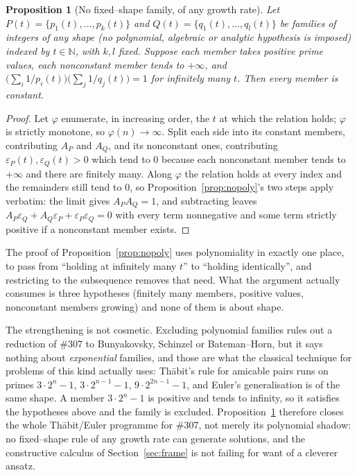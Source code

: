\documentclass[11pt]{article}
\newtheorem{proposition}[theorem]{Proposition}
\theoremstyle{definition}
\begin{document}
\begin{proposition}[No fixed--shape family, of any growth rate]\label{prop:nofamily}
Let $P(t)=\{p_1(t),\dots,p_k(t)\}$ and $Q(t)=\{q_1(t),\dots,q_l(t)\}$ be families of integers of
\emph{any} shape (no polynomial, algebraic or analytic hypothesis is imposed) indexed by
$t\in\mathbb{N}$, with $k,l$ fixed. Suppose each member takes positive prime values, each nonconstant
member tends to $+\infty$, and
$\bigl(\sum_i1/p_i(t)\bigr)\bigl(\sum_j1/q_j(t)\bigr)=1$ for \emph{infinitely many} $t$. Then every
member is constant.
\end{proposition}
\begin{proof}
Let $\varphi$ enumerate, in increasing order, the $t$ at which the relation holds; $\varphi$ is
strictly monotone, so $\varphi(n)\to\infty$. Split each side into its constant members, contributing
$A_P$ and $A_Q$, and its nonconstant ones, contributing $\varepsilon_P(t),\varepsilon_Q(t)>0$ which
tend to $0$ because each nonconstant member tends to $+\infty$ and there are finitely many. Along
$\varphi$ the relation holds at every index and the remainders still tend to $0$, so
Proposition~\ref{prop:nopoly}'s two steps apply verbatim: the limit gives $A_PA_Q=1$, and subtracting
leaves $A_P\varepsilon_Q+A_Q\varepsilon_P+\varepsilon_P\varepsilon_Q=0$ with every term nonnegative
and some term strictly positive if a nonconstant member exists.
\end{proof}

The proof of Proposition~\ref{prop:nopoly} uses polynomiality in exactly one place, to pass from
``holding at infinitely many $t$'' to ``holding identically'', and restricting to the subsequence
removes that need. What the argument actually consumes is three hypotheses (finitely many members,
positive values, nonconstant members growing) and none of them is about shape.

The strengthening is not cosmetic. Excluding polynomial families rules out a reduction of \#307 to
Bunyakovsky, Schinzel or Bateman--Horn, but it says nothing about \emph{exponential} families, and
those are what the classical technique for problems of this kind actually uses: Th\=abit's rule for
amicable pairs runs on primes $3\cdot2^{n}-1$, $3\cdot2^{n-1}-1$, $9\cdot2^{2n-1}-1$, and Euler's
generalisation is of the same shape. A member $3\cdot2^{n}-1$ is positive and tends to infinity, so
it satisfies the hypotheses above and the family is excluded. Proposition~\ref{prop:nofamily}
therefore closes the whole Th\=abit/Euler programme for \#307, not merely its polynomial shadow: no
fixed--shape rule of any growth rate can generate solutions, and the constructive calculus of
Section~\ref{sec:frame} is not failing for want of a cleverer ansatz.
\end{document}
